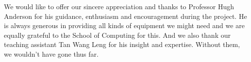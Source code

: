 \documentclass{acm_proc_article-sp}
\begin{document}
We would like to offer our sincere appreciation and thanks to Professor Hugh Anderson for his guidance, enthusiasm and encouragement during the project. He is always generous in providing all kinds of equipment we might need and we are equally grateful to the School of Computing for this. And we also thank our teaching assistant Tan Wang Leng for his insight and expertise. Without them, we wouldn't have gone thus far.


%

%
%

\balancecolumns
\end{document}
